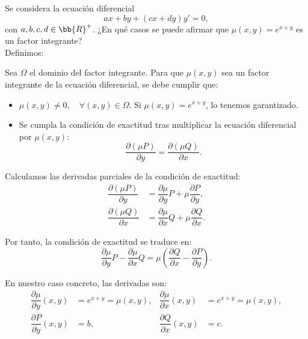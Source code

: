 \documentclass[12pt]{article}
\begin{document}
    \begin{ejercicio}
        Se considera la ecuación diferencial
        \begin{equation*}
            ax + by + (cx + dy)y' = 0,
        \end{equation*}
        con $a, b, c, d \in \bb{R}^+$. ¿En qué casos se puede afirmar que $\mu(x, y) = e^{x+y}$ es un factor integrante?\\

        Definimos:

        Sea $\Omega$ el dominio del factor integrante. Para que $\mu(x, y)$ sea un factor integrante de la ecuación diferencial, se debe cumplir que:
        \begin{itemize}
            \item $\mu(x, y) \neq 0, \quad \forall (x, y) \in \Omega$. Si $\mu(x, y) = e^{x+y}$, lo tenemos garantizado.
            \item Se cumpla la condición de exactitud tras multiplicar la ecuación diferencial por $\mu(x, y)$:
            \begin{equation*}
                \dfrac{\partial (\mu P)}{\partial y} = \dfrac{\partial (\mu Q)}{\partial x}.
            \end{equation*}
        \end{itemize}

        Calculamos las derivadas parciales de la condición de exactitud:
        \begin{align*}
            \dfrac{\partial (\mu P)}{\partial y} &= \dfrac{\partial \mu}{\partial y}P + \mu\dfrac{\partial P}{\partial y},\\
            \dfrac{\partial (\mu Q)}{\partial x} &= \dfrac{\partial \mu}{\partial x}Q + \mu\dfrac{\partial Q}{\partial x}.
        \end{align*}

        Por tanto, la condición de exactitud se traduce en:
        \begin{equation*}
            \dfrac{\partial \mu}{\partial y}P  - \dfrac{\partial \mu}{\partial x}Q = \mu\left(\dfrac{\partial Q}{\partial x} - \dfrac{\partial P}{\partial y}\right).
        \end{equation*}

        En nuestro caso concreto, las derivadas son:
        \begin{align*}
            \dfrac{\partial \mu}{\partial y}(x,y) &= e^{x+y}=\mu(x,y), & \dfrac{\partial \mu}{\partial x}(x,y) &= e^{x+y}=\mu(x,y),\\
            \dfrac{\partial P}{\partial y}(x,y) &= b, & \dfrac{\partial Q}{\partial x}(x,y) &= c.
        \end{align*}


\end{ejercicio}
\end{document}

